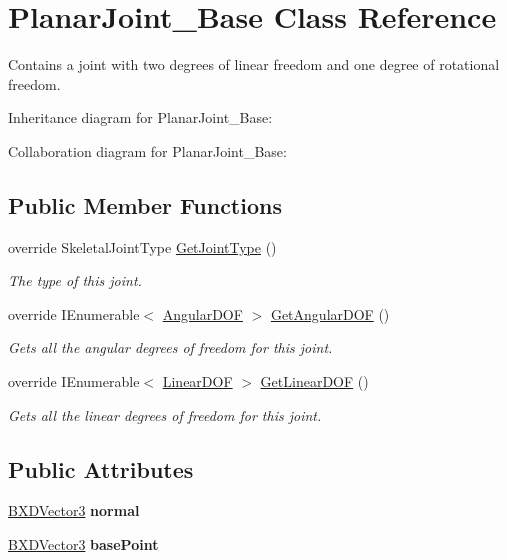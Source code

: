 \hypertarget{class_planar_joint___base}{}\section{Planar\+Joint\+\_\+\+Base Class Reference}
\label{class_planar_joint___base}


Contains a joint with two degrees of linear freedom and one degree of rotational freedom.  




Inheritance diagram for Planar\+Joint\+\_\+\+Base\+:


Collaboration diagram for Planar\+Joint\+\_\+\+Base\+:
\subsection*{Public Member Functions}
\begin{DoxyCompactItemize}
\item 
override Skeletal\+Joint\+Type \hyperlink{class_planar_joint___base_ab4646593b8f3d4b0ef7ddd86e783405e}{Get\+Joint\+Type} ()
\begin{DoxyCompactList}\small\item\em The type of this joint. \end{DoxyCompactList}\item 
override I\+Enumerable$<$ \hyperlink{interface_angular_d_o_f}{Angular\+D\+OF} $>$ \hyperlink{class_planar_joint___base_ad773d6e627d22530181faf6d8654161a}{Get\+Angular\+D\+OF} ()
\begin{DoxyCompactList}\small\item\em Gets all the angular degrees of freedom for this joint. \end{DoxyCompactList}\item 
override I\+Enumerable$<$ \hyperlink{interface_linear_d_o_f}{Linear\+D\+OF} $>$ \hyperlink{class_planar_joint___base_a50dcc45fbe13093f40b7eeef117e8f16}{Get\+Linear\+D\+OF} ()
\begin{DoxyCompactList}\small\item\em Gets all the linear degrees of freedom for this joint. \end{DoxyCompactList}\end{DoxyCompactItemize}
\subsection*{Public Attributes}
\begin{DoxyCompactItemize}
\item 
\mbox{\label{class_planar_joint___base_a1d16b25d6cbe9a2d4fc3d505bd5b0f93}} 
\hyperlink{class_b_x_d_vector3}{B\+X\+D\+Vector3} {\bfseries normal}
\item 
\mbox{\label{class_planar_joint___base_a701dc2eb0b0fed3cccb86727e2d2a73b}} 
\hyperlink{class_b_x_d_vector3}{B\+X\+D\+Vector3} {\bfseries base\+Point}
\end{DoxyCompactItemize}
